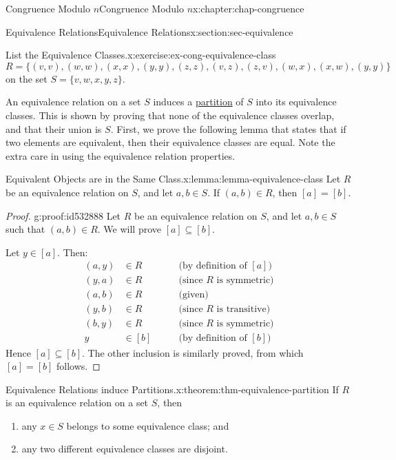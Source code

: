 \documentclass[oneside,10pt,]{book}
\numberwithin{equation}{section}
\newcommand{\amp}{&}
\begin{document}
\begin{chapterptx}{Congruence Modulo \(n\)}{}{Congruence Modulo \(n\)}{}{}{x:chapter:chap-congruence}
\begin{sectionptx}{Equivalence Relations}{}{Equivalence Relations}{}{}{x:section:sec-equivalence}
\begin{inlineexercise}{List the Equivalence Classes.}{x:exercise:ex-cong-equivalence-class}
\begin{equation*}
R = \{(v,v),(w,w),(x,x),(y,y),(z,z),(v,z),(z,v),(w,x),(x,w),(y,y)\}
\end{equation*}
on the set \(S = \{v,w,x,y,z\}\).%
\end{inlineexercise}%
An equivalence relation on a set \(S\) induces a \hyperref[x:definition:def-partition]{partition} of \(S\) into its equivalence classes. This is shown by proving that none of the equivalence classes overlap, and that their union is \(S\). First, we prove the following lemma that states that if two elements are equivalent, then their equivalence classes are equal. Note the extra care in using the equivalence relation properties.%
\begin{lemma}{Equivalent Objects are in the Same Class.}{}{x:lemma:lemma-equivalence-class}%
Let \(R\) be an equivalence relation on \(S\), and let \(a, b \in S\). If \((a,b) \in R\), then \([a] = [b]\).%
\end{lemma}
\begin{proof}{}{g:proof:id532888}
Let \(R\) be an equivalence relation on \(S\), and let \(a, b \in S\) such that \((a,b) \in R\). We will prove \([a] \subseteq [b]\).%
\par
Let \(y \in [a]\). Then:%
\begin{align*}
(a,y) \amp \in R \qquad \amp \text{(by definition of $[a]$)}\\
(y,a) \amp \in R \qquad \amp \text{(since $R$ is symmetric)}\\
(a,b) \amp \in R \qquad \amp \text{(given)}\\
(y,b) \amp \in R \qquad \amp \text{(since $R$ is transitive)}\\
(b,y) \amp \in R \qquad \amp \text{(since $R$ is symmetric)}\\
y \amp \in [b] \qquad \amp \text{(by definition of $[b]$)}
\end{align*}
Hence \([a] \subseteq [b]\). The other inclusion is similarly proved, from which \([a] = [b]\) follows.%
\end{proof}
\begin{theorem}{Equivalence Relations induce Partitions.}{}{x:theorem:thm-equivalence-partition}%
If \(R\) is an equivalence relation on a set \(S\), then%
\begin{enumerate}[label=(\alph*)]
\item{}any \(x \in S\) belongs to some equivalence class; and%
\item{}any two different equivalence classes are disjoint.%
\end{enumerate}

\end{theorem}
\end{sectionptx}
\end{chapterptx}
\end{document}
